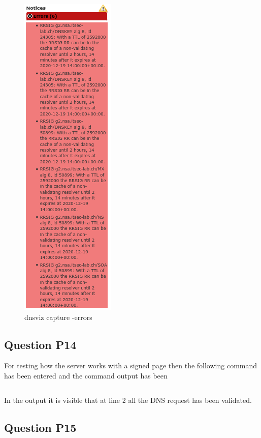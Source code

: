 \begin{figure}[H]
	\centering
	\includegraphics[height=0.5\textheight]{images/errors_dnsviz.png}
	\caption{dnsviz capture -errors}
	\label{fig:dnsviz capture_errors}
\end{figure}


\subsection{Question P14}

For testing how the server works with a signed page then the following command has been entered  and the command output has been

\inputminted{text}{DNSSec_switch_test.txt}
\label{log:DNSSec_switch}

In the output it is visible that at line 2 all the DNS request has been validated.

\subsection{Question P15}
